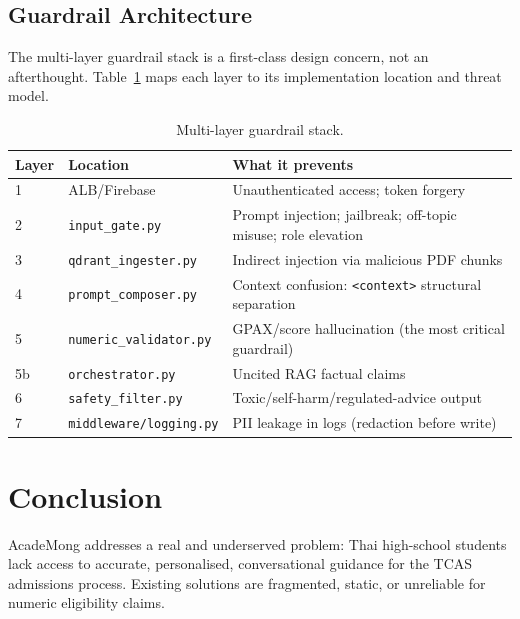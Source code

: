 ﻿\documentclass[12pt,a4paper]{article}
\begin{document}
\subsection{Guardrail Architecture}

The multi-layer guardrail stack is a first-class design concern, not an
afterthought. Table~\ref{tab:guardrails} maps each layer to its implementation
location and threat model.

\begin{table}[H]
\centering
\caption{Multi-layer guardrail stack.}
\label{tab:guardrails}
\renewcommand{\arraystretch}{1.3}
\begin{tabularx}{\textwidth}{@{}llX@{}}
\toprule
\textbf{Layer} & \textbf{Location} & \textbf{What it prevents} \\
\midrule
1 & ALB/Firebase & Unauthenticated access; token forgery \\
2 & \texttt{input\_gate.py} & Prompt injection; jailbreak; off-topic misuse; role elevation \\
3 & \texttt{qdrant\_ingester.py} & Indirect injection via malicious PDF chunks \\
4 & \texttt{prompt\_composer.py} & Context confusion: \texttt{<context>} structural separation \\
5 & \texttt{numeric\_validator.py} & GPAX/score hallucination (the most critical guardrail) \\
5b & \texttt{orchestrator.py} & Uncited RAG factual claims \\
6 & \texttt{safety\_filter.py} & Toxic/self-harm/regulated-advice output \\
7 & \texttt{middleware/logging.py} & PII leakage in logs (redaction before write) \\
\bottomrule
\end{tabularx}
\end{table}

\section{Conclusion}

AcadeMong addresses a real and underserved problem: Thai high-school students lack
access to accurate, personalised, conversational guidance for the TCAS admissions
process. Existing solutions are fragmented, static, or unreliable for numeric
eligibility claims.
\end{document}
